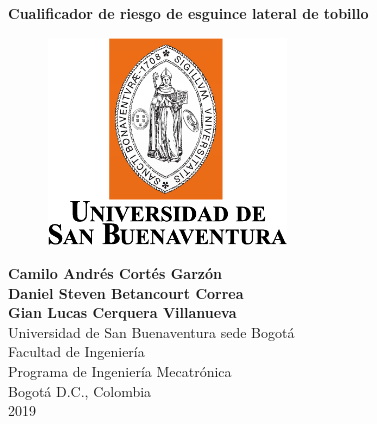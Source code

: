 \cleardoublepage

\thispagestyle{empty} 
\begin{center}
\textbf{ 
\huge{Cualificador de riesgo de esguince lateral de tobillo}}\\[1.0cm]


\begin{figure}[htbp]
	\centering
		\includegraphics[height=5.5cm,keepaspectratio]{OtrosTex/LogoUSB}
\end{figure}

\vspace*{2.5cm} 
\Large\textbf{Camilo Andrés Cortés Garzón \\ Daniel Steven Betancourt Correa \\ Gian Lucas Cerquera Villanueva}\\[1.0cm]

\vspace*{2.5cm} 
\Large{Universidad de San Buenaventura sede Bogotá}\\
\Large{Facultad de Ingeniería}\\
\Large{Programa de Ingeniería Mecatrónica}\\
\large{Bogotá D.C., Colombia\\
2019}\\
\end{center}

\newpage{\pagestyle{empty}\cleardoublepage}
\newpage

